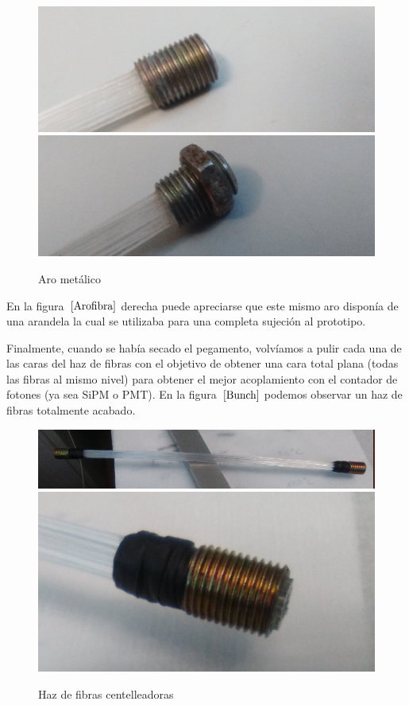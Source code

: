 \begin{figure}[htb]
\centering
{
\includegraphics[scale=0.3]{arometalico.png} 
}
{
\includegraphics[scale=0.3]{arometalicoconrosca.png} 
}
\caption{Aro metálico\label{Arofibra}}
\end{figure} 

En la figura~$\ref{Arofibra}$ derecha puede apreciarse que este mismo aro disponía de una arandela la cual se utilizaba para una completa sujeción al prototipo.

Finalmente, cuando se había secado el pegamento, volvíamos a pulir cada una de las caras del haz de fibras con el objetivo de obtener una cara total plana (todas las fibras al mismo nivel) para obtener el mejor acoplamiento con el contador de fotones (ya sea SiPM o PMT). En la figura~$\ref{Bunch}$ podemos observar un  haz de fibras totalmente acabado.

\begin{figure}[htb]
\centering
{
\includegraphics[scale=0.3]{bunchfibras.png} 
}
{
\includegraphics[scale=0.3]{bunchfibras1.png} 
}
\caption{Haz de fibras centelleadoras\label{Bunch}}
\end{figure} 

